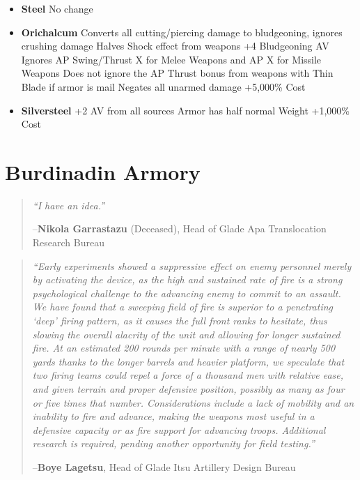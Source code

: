 \documentclass[oneside,11pt,english]{book}
\begin{document}
\begin{itemize}
\item [] \textbf{Steel}
\subitem No change
\end{itemize}

\begin{itemize}
	\item [] \textbf{Orichalcum}
		\subitem Converts all cutting/piercing damage to bludgeoning, ignores crushing damage
		\subitem Halves Shock effect from weapons
		\subitem +4 Bludgeoning AV
		\subitem Ignores AP Swing/Thrust X for Melee Weapons and AP X for Missile Weapons
			\subsubitem Does not ignore the AP Thrust bonus from weapons with Thin Blade if armor is mail
		\subitem Negates all unarmed damage
		\subitem +5,000\% Cost
\end{itemize}

\begin{itemize}
	\item [] \textbf{Silversteel}
		\subitem +2 AV from all sources
		\subitem Armor has half normal Weight 
		\subitem +1,000\% Cost
\end{itemize}

\chapter{Burdinadin Armory}\label{ch:Burdinadin Armory}
\startcontents[chapters]
\clearpage
\begin{quote}
	
	\emph{“I have an idea.”}\par
		\hfill --\textbf{Nikola Garrastazu} (Deceased), Head of Glade Apa Translocation Research Bureau
\end{quote}
\begin{quote}
	\emph{“Early experiments showed a suppressive effect on enemy personnel merely by activating the device, as the high and sustained 
rate of fire is a strong psychological challenge to the advancing enemy to commit to an assault. We have found that a sweeping 
field of fire is superior to a penetrating ‘deep’ firing pattern, as it causes the full front ranks to hesitate, thus slowing the overall 
alacrity of the unit and allowing for longer sustained fire. At an estimated 200 rounds per minute with a range of nearly 500 
yards thanks to the longer barrels and heavier platform, we speculate that two firing teams could repel a force of a thousand men 
with relative ease, and given terrain and proper defensive position, possibly as many as four or five times that number. 
Considerations include a lack of mobility and an inability to fire and advance, making the weapons most useful in a defensive 
capacity or as fire support for advancing troops. Additional research is required, pending another opportunity for field testing.”}\par
	\hfill --\textbf{Boye Lagetsu}, Head of Glade Itsu Artillery Design Bureau 
\end{quote}
\end{document}

